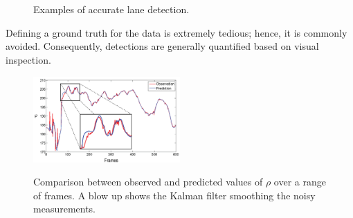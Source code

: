 \documentclass{article}
\begin{document}
\begin{figure}[htb!]
  \centering
  \hspace{0.00001in}
  \\
  \hspace{0.00001in}
  \\
  \caption{Examples of accurate lane detection.}
  \label{fig:lane_detection}
\end{figure}
Defining a ground truth for the data is extremely tedious; hence, it is commonly avoided. Consequently, detections are generally quantified based on visual inspection.
\begin{figure}[htb!]
  \centering
  \includegraphics[width=0.5\textwidth]{IMG/obs_pred_rho.png}\\
  \caption{Comparison between observed and predicted values of $\rho$ over a range of frames. A blow up shows the Kalman filter smoothing the noisy measurements.}
  \label{fig:obs_pred_kalman}
\end{figure}
\end{document}
